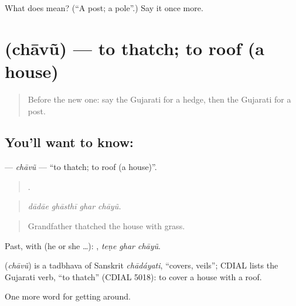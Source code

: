 \begin{tcolorbox}[breakable,colback=teal!4,colframe=teal!35!black,title={Before you move on}]
What does  mean? (\textquotedblleft{}A post; a pole\textquotedblright{}.) Say it once more.
\end{tcolorbox}
\section[\texorpdfstring{\gu{છાવું} (chāvũ)}{છાવું (chāvũ)}]{ (chāvũ) — to thatch; to roof (a house)}

\label{lesson:GU-C420-chavu}



\begin{quote}
Before the new one: say the Gujarati for a hedge, then the Gujarati for a post.
\end{quote}

\subsection*{You'll want to know: }
\textbf{} — \emph{chāvũ} — \textquotedblleft{}to thatch; to roof (a house)\textquotedblright{}.

\begin{quote}
   .
\end{quote}

\begin{quote}
\emph{dādāe ghāsthī ghar chāyũ.}
\end{quote}

\begin{quote}
Grandfather thatched the house with grass.
\end{quote}

Past, with  (he or she …):   , \emph{teṇe ghar chāyũ}.

\begin{cousinweb}
\textbf{} (\emph{chāvũ}) is a tadbhava of Sanskrit \emph{chādáyati}, \textquotedblleft{}covers, veils\textquotedblright{}; CDIAL lists the Gujarati verb, \textquotedblleft{}to thatch\textquotedblright{} (CDIAL 5018): to cover a house with a roof.
\end{cousinweb}

\begin{grammarlens}[title={What you've built}]
One more word for getting around.
\end{grammarlens}

